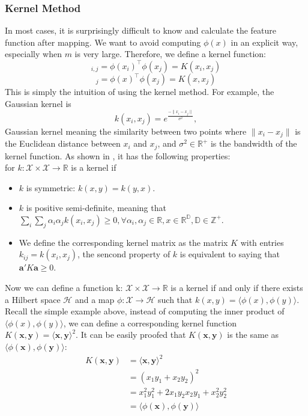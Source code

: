 \subsubsection{Kernel Method}
In most cases, it is surprisingly difficult to know and calculate the feature function after mapping. We want to avoid computing $\phi(x)$ in an explicit way, 
especially when $m$ is very large. Therefore, we define a kernel function:
\begin{equation*}
    [\Phi\Phi^\top]_{i,j}=\phi(x_i)^\top \phi(x_j)=K(x_i,x_j)
\end{equation*}
\begin{equation}
    [\phi(x)^\top\Phi^\top]_j=\phi(x)^\top\phi(x_j)=K(x,x_j)
\end{equation}
This is simply the intuition of using the kernel method. For example, the Gaussian kernel is
\begin{equation*}
    k(x_i, x_j) = e^\frac{-\parallel x_i - x_j \parallel}{\sigma^2},
\end{equation*}
Gaussian kernel meaning the similarity between two points where $\parallel x_i - x_j \parallel$ is the Euclidean distance between $x_i$ and $x_j$, and $\sigma^2 \in \mathbb{R}^+$ is the bandwidth of the kernel function. As shown in \citet{hofmann2008kernel}, it has the following properties:\\
for $k: \mathcal{X} \times \mathcal{X} \rightarrow \mathbb{R}$ is a kernel if
\begin{itemize}
    \item $k$ is symmetric: $k(x,y) = k(y,x)$.
    \item $k$ is positive semi-definite, meaning that $\sum_{i} \sum_{j} \alpha_i \alpha_j k(x_i,x_j)\geq0, \forall \alpha_i, \alpha_j \in \mathbb{R}, x \in \mathbb{R}^\mathbb{D}, \mathbb{D} \in \mathbb{Z}^+$. 
    \item We define the corresponding kernel matrix as the matrix $K$ with entries $k_{ij}=k(x_i,x_j)$, the sencond property of $k$ is equivalent to saying that $\textbf{a}'K \textbf{a}\geq 0$.
\end{itemize}
Now we can define a function k: $\mathcal{X} \times \mathcal{X}  \rightarrow \mathbb{R}$ is a kernel if and 
only if there exists a Hilbert space $\mathcal{H}$ and a map $\phi: \mathcal{X}\rightarrow\mathcal{H}$ such that $k(x,y)=\langle\phi(x),\phi(y)\rangle$. \\
Recall the simple example above, instead of computing the inner product of $\langle\phi(x),\phi(y)\rangle$, we can define 
a corresponding kernel function $K(\textbf{x},\textbf{y})=\langle\textbf{x},\textbf{y}\rangle^2$. It can be easily proofed that $K(\textbf{x},\textbf{y})$ is the same as $\langle\phi(\textbf{x}),\phi(\textbf{y})\rangle$:
\begin{align*}
    K(\textbf{x},\textbf{y})&=\langle\textbf{x},\textbf{y}\rangle^2\\
                            &=(x_1y_1+x_2y_2)^2\\
                            &=x_1^2y_1^2+2x_1y_2x_2y_1+x_2^2y_2^2\\
                            &=\langle\phi(\textbf{x}),\phi(\textbf{y})\rangle
\end{align*}

